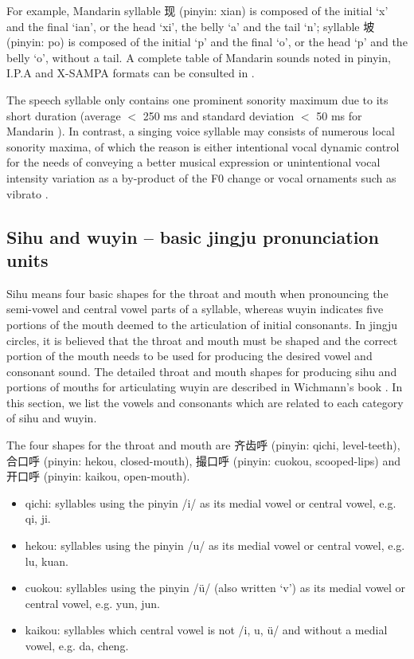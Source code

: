 For example, Mandarin syllable 现 (pinyin: xian) is composed of the initial `x' and the final `ian', or the head `xi', the belly `a' and the tail `n'; syllable 坡 (pinyin: po) is composed of the initial `p' and the final `o', or the head `p' and the belly `o', without a tail. A complete table of Mandarin sounds noted in pinyin, I.P.A and \gls{X-SAMPA} formats can be consulted in .

The speech syllable only contains one prominent sonority maximum due to its short duration (average $<$ 250 ms and standard deviation $<$ 50 ms for Mandarin \cite{wang_syllable_1994}). In contrast, a singing voice syllable may consists of numerous local sonority maxima, of which the reason is either intentional vocal dynamic control for the needs of conveying a better musical expression or unintentional vocal intensity variation as a by-product of the F0 change \cite{titze_vocal_1992} or vocal ornaments such as vibrato \cite{horii_note_1988}.

\subsection{Sihu and wuyin -- basic jingju pronunciation units}\label{sec:ch2:sihu_wuyin}

Sihu means four basic shapes for the throat and mouth when pronouncing the semi-vowel and central vowel parts of a syllable, whereas wuyin indicates five portions of the mouth deemed to the articulation of initial consonants. In jingju circles, it is believed that the throat and mouth must be shaped and the correct portion of the mouth needs to be used for producing the desired vowel and consonant sound. The detailed throat and mouth shapes for producing sihu and portions of mouths for articulating wuyin are described in Wichmann's book \cite{Wichmann1991a}. In this section, we list the vowels and consonants which are related to each category of sihu and wuyin.

The four shapes for the throat and mouth are 齐齿呼 (pinyin: qichi, level-teeth), 合口呼 (pinyin: hekou, closed-mouth), 撮口呼 (pinyin: cuokou, scooped-lips) and 开口呼 (pinyin: kaikou, open-mouth). 
\begin{itemize}[itemsep=0pt]
\item qichi: syllables using the pinyin /i/ as its medial vowel or central vowel, e.g. qi, ji.
\item hekou: syllables using the pinyin /u/ as its medial vowel or central vowel, e.g. lu, kuan.
\item cuokou: syllables using the pinyin /ü/ (also written `v') as its medial vowel or central vowel, e.g. yun, jun.
\item kaikou: syllables which central vowel is not /i, u, ü/ and without a medial vowel, e.g. da, cheng.
\end{itemize}

